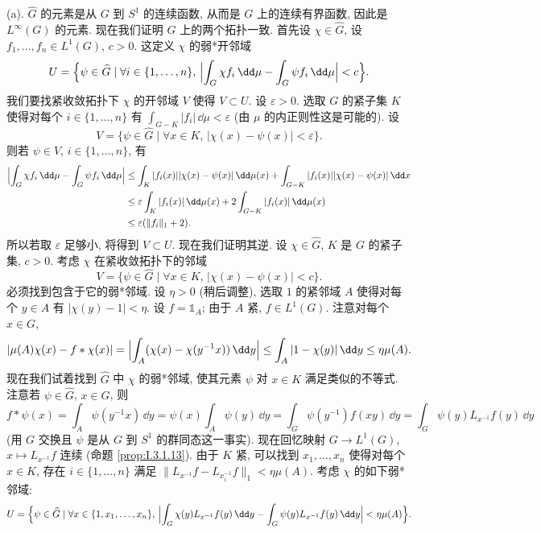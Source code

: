 \begin{solution}
(a). $\widehat{G}$ 的元素是从 $G$ 到 $S^1$ 的连续函数, 从而是 $G$ 上的连续有界函数, 因此是 $L^{\infty}(G)$ 的元素. 现在我们证明 $\widehat{G}$ 上的两个拓扑一致.
首先设 $\chi \in \widehat{G}$, 设 $f_1, \ldots, f_n \in L^1(G)$, $c > 0$. 这定义 $\chi$ 的弱*开邻域
\[
U = \Bigl\{\psi \in \widehat{G} \mid \forall i \in \{1, \ldots, n\},\, \Bigl|\int_G \chi f_i\,\dd\mu - \int_G \psi f_i\,\dd\mu\Bigr| < c\Bigr\}.
\]
我们要找紧收敛拓扑下 $\chi$ 的开邻域 $V$ 使得 $V \subset U$. 设 $\varepsilon > 0$. 选取 $G$ 的紧子集 $K$ 使得对每个 $i \in \{1, \ldots, n\}$ 有 $\int_{G-K}|f_i|\,\dd\mu < \varepsilon$ (由 $\mu$ 的内正则性这是可能的). 设
\[
V = \{\psi \in \widehat{G} \mid \forall x \in K,\, |\chi(x) - \psi(x)| < \varepsilon\}.
\]
则若 $\psi \in V$, $i \in \{1, \ldots, n\}$, 有
\begin{align*}
\Bigl|\int_G \chi f_i\,\dd\mu - \int_G \psi f_i\,\dd\mu\Bigr| &\leq \int_K |f_i(x)||\chi(x) - \psi(x)|\,\dd\mu(x) + \int_{G-K}|f_i(x)||\chi(x) - \psi(x)|\,\dd x \\
&\leq \varepsilon\int_K |f_i(x)|\,\dd\mu(x) + 2\int_{G-K}|f_i(x)|\,\dd\mu(x) \\
&\leq \varepsilon(\|f_i\|_1 + 2).
\end{align*}
所以若取 $\varepsilon$ 足够小, 将得到 $V \subset U$.
现在我们证明其逆. 设 $\chi \in \widehat{G}$, $K$ 是 $G$ 的紧子集, $c > 0$. 考虑 $\chi$ 在紧收敛拓扑下的邻域
\[
V = \{\psi \in \widehat{G} \mid \forall x \in K,\, |\chi(x) - \psi(x)| < c\}.
\]
必须找到包含于它的弱*邻域. 设 $\eta > 0$ (稍后调整), 选取 $1$ 的紧邻域 $A$ 使得对每个 $y \in A$ 有 $|\chi(y) - 1| < \eta$. 设 $f = \mathbb{1}_A$; 由于 $A$ 紧, $f \in L^1(G)$. 注意对每个 $x \in G$,
\[
|\mu(A)\chi(x) - f * \chi(x)| = \Bigl|\int_A (\chi(x) - \chi(y^{-1}x))\,\dd y\Bigr| \leq \int_A |1 - \chi(y)|\,\dd y \leq \eta\mu(A).
\]
现在我们试着找到 $\widehat{G}$ 中 $\chi$ 的弱*邻域, 使其元素 $\psi$ 对 $x \in K$ 满足类似的不等式. 注意若 $\psi \in \widehat{G}$, $x \in G$, 则
\[
f * \psi(x) = \int_A \psi(y^{-1}x)\,\dd y = \psi(x)\int_A \psi(y)\,\dd y = \int_G \psi(y^{-1})f(xy)\,\dd y = \int_G \psi(y)L_{x^{-1}}f(y)\,\dd y
\]
(用 $G$ 交换且 $\psi$ 是从 $G$ 到 $S^1$ 的群同态这一事实). 现在回忆映射 $G \to L^1(G)$, $x \longmapsto L_{x^{-1}}f$ 连续 (命题 \ref{prop:I.3.1.13}). 由于 $K$ 紧, 可以找到 $x_1, \ldots, x_n$ 使得对每个 $x \in K$, 存在 $i \in \{1, \ldots, n\}$ 满足 $\|L_{x^{-1}}f - L_{x_i^{-1}}f\|_1 < \eta\mu(A)$. 考虑 $\chi$ 的如下弱*邻域:
\[
U = \Bigl\{\psi \in \widehat{G} \mid \forall x \in \{1, x_1, \ldots, x_n\},\, \Bigl|\int_G \chi(y)L_{x^{-1}}f(y)\,\dd y - \int_G \psi(y)L_{x^{-1}}f(y)\,\dd y\Bigr| < \eta\mu(A)\Bigr\}.
\]
\end{solution}
